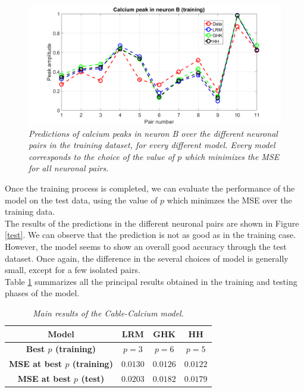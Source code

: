 \documentclass[12pt, a4paper]{report}
\begin{document}
\begin{figure}[H]
	\begin{center}
		\hspace*{-1.5 cm}
		\includegraphics[scale=0.5]{training.png} 
	\end{center} 
	\caption{\textit{Predictions of calcium peaks in neuron B over the different neuronal pairs in the training dataset, for every different model. Every model corresponds to the choice of the value of $p$ which minimizes the MSE for all neuronal pairs.}}
	\label{training}
\end{figure}


Once the training process is completed, we can evaluate the performance of the model on the test data, using the value of $p$ which minimzes the MSE over the training data.\\
The results of the predictions in the different neuronal pairs are shown in Figure \ref{test}. We can observe that the prediction is not as good as in the training case. However,  the model seems to show an overall good accuracy through the test dataset. Once again, the difference in the several choices of model is generally small, except for a few isolated pairs.\\
Table \ref{results} summarizes all the principal results obtained in the training and testing phases of the model.


\begin{table} [H]
	\centering
	\begin{tabular}{ |c|c|c|c| } 
		
		\hline
		\textbf{Model} & \textbf{LRM} & \textbf{GHK} & \textbf{HH} \\
		\hline
		\textbf{Best $p$ (training)}  & $p=3$ & $p=6$ & $p=5$ \\
		\hline
		\textbf{MSE at best $p$ (training)}  & $0.0130$ & $0.0126$ & $0.0122$  \\
		\hline
		\textbf{MSE at best $p$ (test)}  & $0.0203$ & $0.0182$ & $0.0179$  \\
		\hline
		
		
	\end{tabular} \caption{\textit{Main results of the Cable-Calcium model}.\label{results}}
\end{table}
\end{document}
